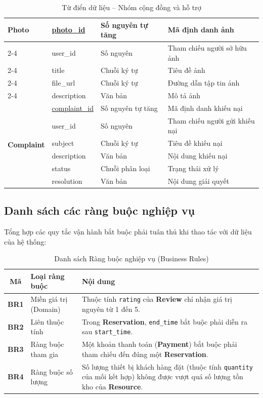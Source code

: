 \begin{table}[htbp]
\begin{tabular}{|l|l|l|p{5.5cm}|}
        \multirow{5}{*}{\textbf{Photo}}
        & \underline{photo\_id} & Số nguyên tự tăng & Mã định danh ảnh \\ \cline{2-4}
        & user\_id & Số nguyên & Tham chiếu người sở hữu ảnh \\ \cline{2-4}
        & title & Chuỗi ký tự & Tiêu đề ảnh \\ \cline{2-4}
        & file\_url & Chuỗi ký tự & Đường dẫn tập tin ảnh \\ \cline{2-4}
        & description & Văn bản & Mô tả ảnh \\ \hline
        \multirow{6}{*}{\textbf{Complaint}}
        & \underline{complaint\_id} & Số nguyên tự tăng & Mã định danh khiếu nại \\ \cline{2-4}
        & user\_id & Số nguyên & Tham chiếu người gửi khiếu nại \\ \cline{2-4}
        & subject & Chuỗi ký tự & Tiêu đề khiếu nại \\ \cline{2-4}
        & description & Văn bản & Nội dung khiếu nại \\ \cline{2-4}
        & status & Chuỗi phân loại & Trạng thái xử lý \\ \cline{2-4}
        & resolution & Văn bản & Nội dung giải quyết \\ \hline
    \end{tabular}
    \caption{Từ điển dữ liệu -- Nhóm cộng đồng và hỗ trợ}
\end{table}

\subsection{Danh sách các ràng buộc nghiệp vụ}
Tổng hợp các quy tắc vận hành bắt buộc phải tuân thủ khi thao tác với dữ liệu của hệ thống:

\begin{table}[htbp]
    \centering
    \label{tab:business_rules}
    \renewcommand{\arraystretch}{1.3}
    \begin{tabular}{|c|p{3.5cm}|p{8.5cm}|}
        \hline
        \textbf{Mã} & \textbf{Loại ràng buộc} & \textbf{Nội dung} \\ \hline
        \textbf{BR1} & Miền giá trị (Domain) & Thuộc tính \texttt{rating} của \textbf{Review} chỉ nhận giá trị nguyên từ 1 đến 5. \\ \hline
        \textbf{BR2} & Liên thuộc tính & Trong \textbf{Reservation}, \texttt{end\_time} bắt buộc phải diễn ra sau \texttt{start\_time}. \\ \hline
        \textbf{BR3} & Ràng buộc tham gia & Một khoản thanh toán (\textbf{Payment}) bắt buộc phải tham chiếu đến đúng một \textbf{Reservation}. \\ \hline
        \textbf{BR4} & Ràng buộc số lượng & Số lượng thiết bị khách hàng đặt (thuộc tính \texttt{quantity} của mối kết hợp) không được vượt quá số lượng tồn kho của \textbf{Resource}. \\ \hline
    \end{tabular}
    \caption{Danh sách Ràng buộc nghiệp vụ (Business Rules)}
\end{table}
